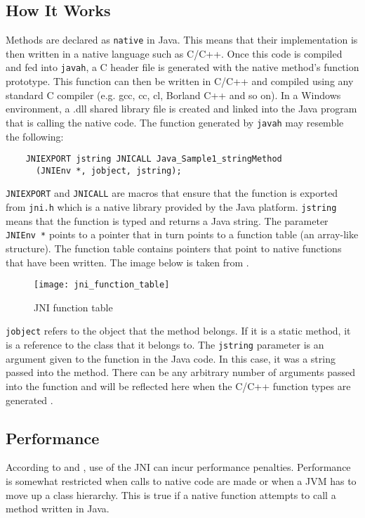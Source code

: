 \documentclass[12pt,a4paper,oneside]{article}
\def\code#1{\texttt{#1}}
\begin{document}
  \subsection{How It Works}
    Methods are declared as \code{native} in Java. This means that their implementation is then written in a native language such as C/C++. Once this code is compiled and fed into \code{javah}, a C header file is generated with the native method's function prototype. This function can then be written in C/C++ and compiled using any standard C compiler (e.g. gcc, cc, cl, Borland C++ and so on). In a Windows environment, a .dll shared library file is created and linked into the Java program that is calling the native code. The function generated by \code{javah} may resemble the following:
    \begin{verbatim}
    JNIEXPORT jstring JNICALL Java_Sample1_stringMethod
      (JNIEnv *, jobject, jstring);
    \end{verbatim}
    \code{JNIEXPORT} and \code{JNICALL} are macros that ensure that the function is exported from \code{jni.h} which is a native library provided by the Java platform. \code{jstring} means that the function is typed and returns a Java string. The parameter \code{JNIEnv *} points to a pointer that in turn points to a function table (an array-like structure). The function table contains pointers that point to native functions that have been written. The image below is taken from \cite{LiangJNISpecification}.
    \begin{figure}[H]
    \texttt{[image: jni\_function\_table]}
    \caption{JNI function table}
    \end{figure}
    \code{jobject} refers to the object that the method belongs. If it is a static method, it is a reference to the class that it belongs to. The \code{jstring} parameter is an argument given to the function in the Java code. In this case, it was a string passed into the method. There can be any arbitrary number of arguments passed into the function and will be reflected here when the C/C++ function types are generated \citep{LiangJNISpecification}.
  \subsection{Performance}
    According to \cite{IBM2009} and \cite{WellsIPCMultiProc}, use of the JNI can incur performance penalties. Performance is somewhat restricted when calls to native code are made or when a JVM has to move up a class hierarchy. This is true if a native function attempts to call a method written in Java.
\end{document}
